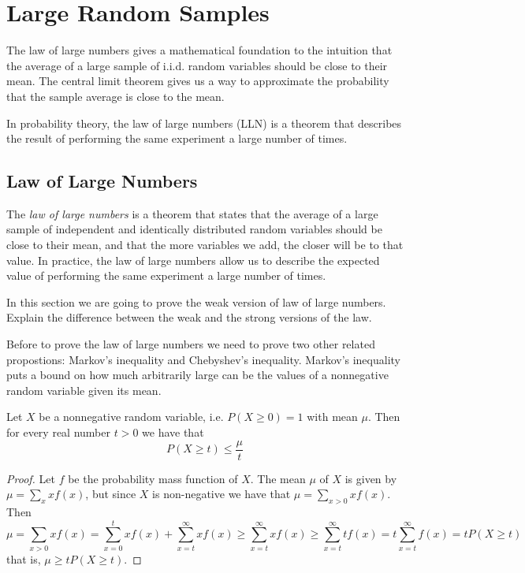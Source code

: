 %
%

\section{Large Random Samples}
\label{sec:probability_random_samples}

{\color{red} The law of large numbers gives a mathematical foundation to the intuition that the average of a large sample of i.i.d. random variables should be close to their mean. The central limit theorem gives us a way to approximate the probability that the sample average is close to the mean.}

{\color{red} In probability theory, the law of large numbers (LLN) is a theorem that describes the result of performing the same experiment a large number of times.}


\subsection{Law of Large Numbers}

The \emph{law of large numbers} is a theorem that states that the average of a large sample of independent and identically distributed random variables should be close to their mean, and that the more variables we add, the closer will be to that value. In practice, the law of large numbers allow us to describe the expected value of performing the same experiment a large number of times.

In this section we are going to prove the weak version of law of large numbers. {\color{red} Explain the difference between the weak and the strong versions of the law.}

Before to prove the law of large numbers we need to prove two other related propostions: Markov's inequality and Chebyshev's inequality. Markov's inequality puts a bound on how much arbitrarily large can be the values of a nonnegative random variable given its mean. 

\begin{proposition}
Let $X$ be a nonnegative random variable, i.e. $P\left( X \geq 0 \right) = 1$ with mean $\mu$. Then for every real number $t>0$ we have that 
\[
P \left( X \geq t \right) \leq \frac{\mu}{t}
\]
\end{proposition}
\begin{proof}
Let $f$ be the probability mass function of $X$. The mean $\mu$ of $X$ is given by $\mu = \sum_{x} x f \left( x \right)$, but since $X$ is non-negative we have that $\mu = \sum_{x>0} x f \left( x \right)$. Then
\[
\mu = \sum_{x>0} x f \left( x \right) = \sum_{x=0}^{t} x f \left( x \right) + \sum_{x=t}^{\infty} x f \left( x \right) \geq
\sum_{x=t}^{\infty} x f \left( x \right) \geq \sum_{x=t}^{\infty} t f \left( x \right) = t \sum_{x=t}^{\infty} f \left( x \right) =
t P \left( X \geq t \right)
\]
that is, $\mu \geq t P \left( X \geq t \right)$.
\end{proof}

